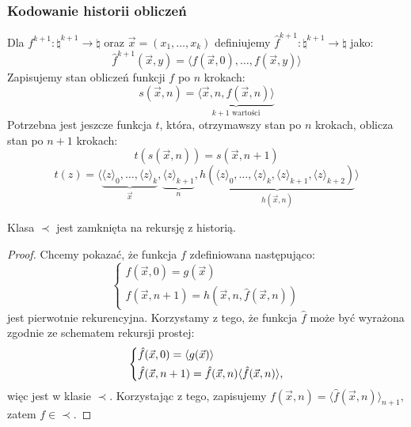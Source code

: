 \subsubsection*{Kodowanie historii obliczeń}
Dla \( f^{k+1} : \natural^{k+1} \rightarrow \natural \) oraz \( \vec{x} = (x_1, \ldots, x_k) \) definiujemy \( \hat{f}^{k+1} : \natural^{k+1} \rightarrow \natural \) jako:
\[ \hat{f}^{k+1}(\vec{x}, y) = \langle f(\vec{x}, 0), \ldots, f(\vec{x}, y) \rangle \]
Zapisujemy stan obliczeń funkcji \( f \) po \( n \) krokach:
\[ s(\vec{x}, n) = \underbrace{\langle \vec{x}, n, f(\vec{x}, n) \rangle}_{k+1 \text{ wartości}} \]
Potrzebna jest jeszcze funkcja \( t \), która, otrzymawszy stan po \( n \) krokach, oblicza stan po \( n+1 \) krokach:
\[ t(s(\vec{x}, n)) = s(\vec{x}, n+1) \]
\[ t(z) = \langle \underbrace{\langle z \rangle_0, \ldots, \langle z \rangle_k}_{\vec{x}}, \underbrace{\langle z \rangle_{k+1}}_{n}, \underbrace{h(\langle z \rangle_0, \ldots, \langle z \rangle_k, \langle z \rangle_{k+1}, \langle z \rangle_{k+2})}_{h(\vec{x}, n)} \rangle \]
\begin{theorem}
    Klasa \( \prec \) jest zamknięta na rekursję z historią.
\end{theorem}
\begin{proof}
    Chcemy pokazać, że funkcja \( f \) zdefiniowana następująco:
    \[\begin{cases*}
        f(\vec{x}, 0) = g(\vec{x}) \\
        f(\vec{x}, n+1) = h(\vec{x}, n, \hat{f}(\vec{x}, n))
    \end{cases*}\]
    jest pierwotnie rekurencyjna.
    Korzystamy z tego, że funkcja \( \hat{f} \) może być wyrażona zgodnie ze schematem rekursji prostej:
    \[\begin{cases*}
        \hat{f}(\vec{x}, 0) = \langle g(\vec{x}) \rangle \\
        \hat{f}(\vec{x}, n+1) = \hat{f}(\vec{x}, n) \* \langle \hat{f}(\vec{x}, n) \rangle,
    \end{cases*}\]
    więc jest w klasie \( \prec \).
    Korzystając z tego, zapisujemy
    \( f(\vec{x}, n) = \langle \hat{f}(\vec{x}, n) \rangle_{n+1}, \)
    zatem \( f \in \prec \).
\end{proof}

